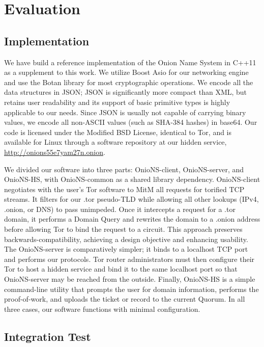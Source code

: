 \documentclass[USenglish,oneside,twocolumn]{article}
\begin{document}
\section{Evaluation}
\label{sec:Evaluation}

\subsection{Implementation}

We have build a reference implementation of the Onion Name System in C++11 as a supplement to this work. We utilize Boost Asio \cite{AsioLib} for our networking engine and use the Botan \cite{BotanLib} library for most cryptographic operations. We encode all the data structures in JSON; JSON is significantly more compact than XML, but retains user readability and its support of basic primitive types is highly applicable to our needs. Since JSON is usually not capable of carrying binary values, we encode all non-ASCII values (such as SHA-384 hashes) in base64. Our code is licensed under the Modified BSD License, identical to Tor, and is available for Linux through a software repository at our hidden service, \href{http://onions55e7yam27n.onion}{http://onions55e7yam27n.onion}.

We divided our software into three parts: OnioNS-client, OnioNS-server, and OnioNS-HS, with OnioNS-common as a shared library dependency. OnioNS-client negotiates with the user's Tor software to MitM all requests for torified TCP streams. It filters for our .tor pseudo-TLD while allowing all other lookups (IPv4, .onion, or DNS) to pass unimpeded. Once it intercepts a request for a .tor domain, it performs a Domain Query and rewrites the domain to a .onion address before allowing Tor to bind the request to a circuit. This approach preserves backwards-compatibility, achieving a design objective and enhancing usability. The OnioNS-server is comparatively simpler; it binds to a localhost TCP port and performs our protocols. Tor router administrators must then configure their Tor to host a hidden service and bind it to the same localhost port so that OnioNS-server may be reached from the outside. Finally, OnioNS-HS is a simple command-line utility that prompts the user for domain information, performs the proof-of-work, and uploads the ticket or record to the current Quorum. In all three cases, our software functions with minimal configuration.

\subsection{Integration Test}
\end{document}
